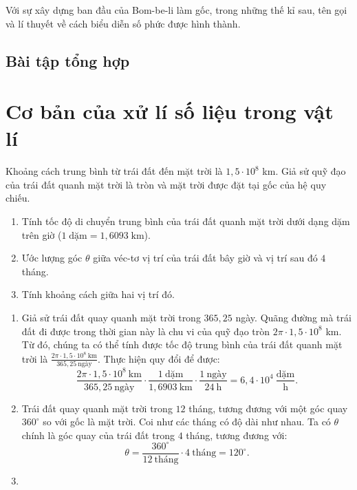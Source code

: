 \documentclass[a4paper, titlepage, openany]{book}
\newcounter{exercise}
\newcounter{solution}
\numberwithin{equation}{chapter}
\begin{document}
Với sự xây dựng ban đầu của Bom-be-li làm gốc, trong những thế kỉ sau, tên gọi và lí thuyết về cách biểu diễn số phức được hình thành.

\section{Bài tập tổng hợp}


\chapter{Cơ bản của xử lí số liệu trong vật lí}
\exercise Khoảng cách trung bình từ trái đất đến mặt trời là $1{,}5 \cdot 10^8$ km. Giả sử quỹ đạo của trái đất quanh mặt trời là tròn và mặt trời được đặt tại gốc của hệ quy chiếu.
\begin{enumerate}
   \item Tính tốc độ di chuyển trung bình của trái đất quanh mặt trời dưới dạng dặm trên giờ ($1 \;\text{dặm}=1{,}6093\;\text{km}$).
   \item Ước lượng góc $\theta$ giữa véc-tơ vị trí của trái đất bây giờ và vị trí sau đó $4$ tháng.
   \item Tính khoảng cách giữa hai vị trí đó.
\end{enumerate}
\solution
\begin{enumerate}
   \item Giả sử trái đất quay quanh mặt trời trong $365{,}25$ ngày. Quãng đường mà trái đất đi được trong thời gian này là chu vi của quỹ đạo tròn $2 \pi \cdot 1{,}5 \cdot 10^8$ km. Từ đó, chúng ta có thể tính được tốc độ trung bình của trái đất quanh mặt trời là $\frac{2 \pi \cdot 1{,}5 \cdot 10^8\ \text{km}}{365{,}25\ \text{ngày}}$. Thực hiện quy đổi để được:
      \[
         \frac{2 \pi \cdot 1{,}5 \cdot 10^8\ \text{km}}{365{,}25\ \text{ngày}}
         \cdot \frac{1\ \text{dặm}}{1{,}6903\ \text{km}}
         \cdot \frac{1\ \text{ngày}}{24\ \text{h}}
         = \boxed{6{,}4\cdot 10^4\ \frac{\text{dặm}}{\text{h}}}.
      \]
   \item Trái đất quay quanh mặt trời trong $12$ tháng, tương đương với một góc quay $360^{\circ}$ so với gốc là mặt trời. Coi như các tháng có độ dài như nhau. Ta có $\theta$ chính là góc quay của trái đất trong $4$ tháng, tương đương với:
   \[
      \theta = \frac{360^{\circ}}{12\ \text{tháng}} \cdot 4\ \text{tháng}= \boxed{120^{\circ}}.
   \]
   \item
\end{enumerate}
\end{document}
